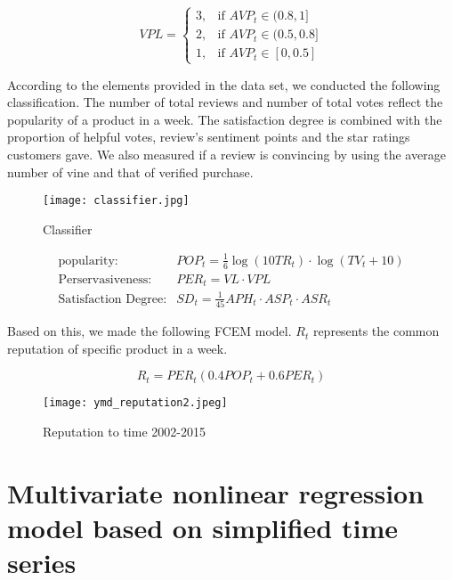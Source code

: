 \documentclass{mcmthesis}
\begin{document}
  \begin{equation}
    VPL = \begin{cases}
      3, & \text{if } AVP_t \in (0.8, 1] \\
      2, & \text{if } AVP_t \in (0.5, 0.8] \\
      1, & \text{if } AVP_t \in  [0, 0.5] 
    \end{cases}
  \end{equation}


  According to the elements provided in the data set, we conducted the following classification. The number of total reviews and number of total votes reflect the popularity of a product in a week. The satisfaction degree is combined with the proportion of helpful votes, review’s sentiment points and the star ratings customers gave. We also measured if a review is convincing by using the average number of vine and that of verified purchase.

  \begin{figure}[!h]
    \small
    \centering
    \texttt{[image: classifier.jpg]}
    \caption{Classifier} %
  \end{figure}


  \begin{equation}
    \begin{aligned}
      \text{popularity}: & POP_t  = \frac{1}{6} \log{(10 TR_t)} \cdot \log{(TV_t + 10)} \\
      \text{Perservasiveness}: & PER_t = VL \cdot VPL \\
      \text{Satisfaction Degree}: & SD_t = \frac{1}{45} APH_t \cdot ASP_t \cdot ASR_t
    \end{aligned}
  \end{equation}

  Based on this, we made the following FCEM model.  $R_t$ represents the common reputation of specific product in a week.

  \begin{equation}
    R_t = PER_t (0.4 POP_t + 0.6 PER_t)
  \end{equation}


  \begin{figure}[!h]
    \small
    \centering
    \texttt{[image: ymd\_reputation2.jpeg]}
    \caption{Reputation to time 2002-2015} %
  \end{figure}


\section{Multivariate nonlinear regression model based on simplified time series}
\end{document}
